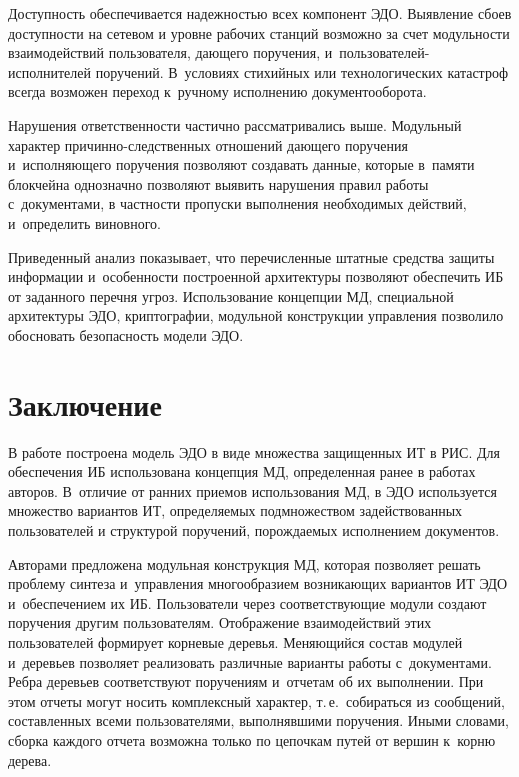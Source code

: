 \begin{multicols}{2}
  Доступность обеспечивается надежностью всех компонент ЭДО. Выявление 
сбоев доступности на сетевом и уровне рабочих станций возможно за счет 
модульности взаимодействий пользователя, да\-юще\-го поручения, 
и~поль\-зо\-ва\-те\-лей-ис\-пол\-ни\-те\-лей поручений. В~условиях стихийных или 
технологических катастроф всегда возможен переход к~ручному исполнению 
документооборота.
  
  Нарушения ответственности частично рас\-смат\-ри\-ва\-лись выше. Модульный 
характер при\-чин\-но-след\-ст\-вен\-ных отношений дающего поручения 
и~исполняющего поручения позволяют создавать данные, которые в~памяти 
блокчейна однозначно позволяют выявить нарушения правил работы 
с~документами, в частности пропуски выполнения необходимых действий, 
и~определить виновного.
  
  Приведенный анализ показывает, что пе\-ре\-чис\-лен\-ные штатные средства защиты 
информации и~особенности построенной архитектуры позволяют обеспечить ИБ 
от заданного перечня угроз. Использование концепции МД, специальной 
архитектуры ЭДО, криптографии, модульной конструкции управ\-ле\-ния позволило 
обосновать безопас\-ность модели ЭДО. 

\vspace*{-6pt}
  
  \section{Заключение }
  
  \vspace*{-2pt}
  
  В работе построена модель ЭДО в виде множества защищенных ИТ в РИС. Для 
обеспечения ИБ использована концепция МД, определенная ранее в работах 
авторов. В~отличие от ранних приемов использования МД, в ЭДО используется 
множество вариантов ИТ, определяемых подмножеством задействованных 
пользователей и структурой поручений, порождаемых исполнением документов. 
  
  Авторами предложена модульная конструкция МД, которая позволяет решать 
проблему синтеза и~управ\-ле\-ния многообразием возникающих вариантов ИТ ЭДО 
и~обеспечением их ИБ. Пользователи через соответствующие модули создают 
поручения другим пользователям. Отображение взаимодействий этих 
пользователей формирует корневые деревья. Меняющийся состав модулей 
и~деревьев позволяет реализовать различные варианты работы с~документами. 
Ребра деревьев соответствуют поручениям и~отчетам об их выполнении. При этом 
отчеты могут носить комплексный характер, т.\,е.\ собираться из сообщений, 
составленных всеми пользователями, выполнявшими поручения. Иными словами, 
сборка каждого отчета возможна только по цепочкам путей от вершин к~корню 
дерева.
  

\end{multicols}
